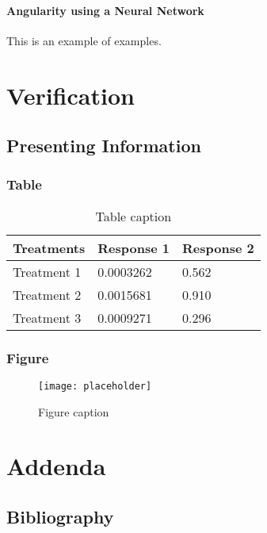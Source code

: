 \documentclass[11pt,fleqn,,a4paper,twoside,openright]{book}
\begin{document}
\subsection{Angularity using a Neural Network} \label{NeuralNet}


This is an example of examples.

\part{Verification}


\chapter{Presenting Information}

\section{Table}

\begin{table}[h]
\centering
\begin{tabular}{l l l}
\toprule
\textbf{Treatments} & \textbf{Response 1} & \textbf{Response 2}\\
\midrule
Treatment 1 & 0.0003262 & 0.562 \\
Treatment 2 & 0.0015681 & 0.910 \\
Treatment 3 & 0.0009271 & 0.296 \\
\bottomrule
\end{tabular}
\caption{Table caption}
\end{table}

\section{Figure}

\begin{figure}[h]
\centering\texttt{[image: placeholder]}
\caption{Figure caption}
\end{figure}

\part{Addenda}

\chapter*{Bibliography}
\end{document}
